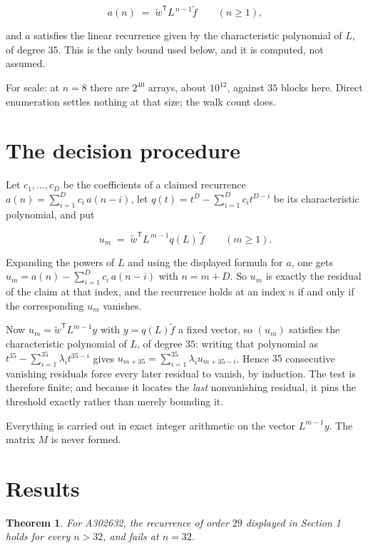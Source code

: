 \documentclass[11pt]{article}
\newtheorem{theorem}{Theorem}
\theoremstyle{definition}
\begin{document}
\[a(n) \;=\; \tilde w^{\mathsf T} L^{\,n-1} \tilde f \qquad (n \ge 1),\]

and $a$ satisfies the linear recurrence given by the characteristic polynomial of $L$, of degree $35$. This is the only bound used below, and it is computed, not assumed.

For scale: at $n = 8$ there are $2^{40}$ arrays, about $10^{12}$, against $35$ blocks here. Direct enumeration settles nothing at that size; the walk count does.

\section{The decision procedure}

Let $c_1,\dots,c_D$ be the coefficients of a claimed recurrence $a(n) = \sum_{i=1}^{D} c_i\,a(n-i)$, let $q(t) = t^{D} - \sum_{i=1}^{D} c_i t^{D-i}$ be its characteristic polynomial, and put

\[u_m \;=\; \tilde w^{\mathsf T} L^{\,m-1} q(L)\,\tilde f \qquad (m \ge 1).\]

Expanding the powers of $L$ and using the displayed formula for $a$, one gets $u_m = a(n) - \sum_{i=1}^{D} c_i\,a(n-i)$ with $n = m + D$. So $u_m$ is exactly the residual of the claim at that index, and the recurrence holds at an index $n$ if and only if the corresponding $u_m$ vanishes.

Now $u_m = \tilde w^{\mathsf T} L^{m-1} y$ with $y = q(L)\tilde f$ a fixed vector, so $(u_m)$ satisfies the characteristic polynomial of $L$, of degree $35$: writing that polynomial as $t^{35} - \sum_{i=1}^{35} \lambda_i t^{35-i}$ gives $u_{m+35} = \sum_{i=1}^{35} \lambda_i u_{m+35-i}$. Hence $35$ consecutive vanishing residuals force every later residual to vanish, by induction. The test is therefore finite; and because it locates the {\itshape last} nonvanishing residual, it pins the threshold exactly rather than merely bounding it.

Everything is carried out in exact integer arithmetic on the vector $L^{m-1}y$. The matrix $M$ is never formed.

\section{Results}

\begin{theorem} For A302632, the recurrence of order $29$ displayed in Section 1 holds for every $n > 32$, and fails at $n = 32$.\end{theorem}
\end{document}
